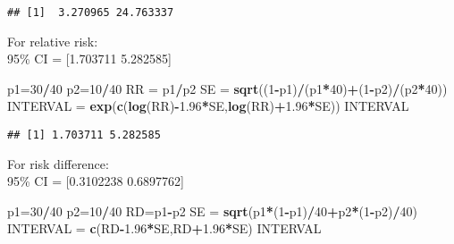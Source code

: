 \documentclass[]{article}
\newenvironment{Shaded}{\begin{snugshade}}{\end{snugshade}}
\newcommand{\KeywordTok}[1]{\textcolor[rgb]{0.13,0.29,0.53}{\textbf{#1}}}
\newcommand{\DecValTok}[1]{\textcolor[rgb]{0.00,0.00,0.81}{#1}}
\newcommand{\FloatTok}[1]{\textcolor[rgb]{0.00,0.00,0.81}{#1}}
\newcommand{\StringTok}[1]{\textcolor[rgb]{0.31,0.60,0.02}{#1}}
\newcommand{\OperatorTok}[1]{\textcolor[rgb]{0.81,0.36,0.00}{\textbf{#1}}}
\newcommand{\NormalTok}[1]{#1}
\begin{document}
\begin{verbatim}
## [1]  3.270965 24.763337
\end{verbatim}

For relative risk:\\
95\% CI = {[}1.703711 5.282585{]}

\begin{Shaded}
\begin{Highlighting}[]
\NormalTok{p1=}\DecValTok{30}\OperatorTok{/}\DecValTok{40}
\NormalTok{p2=}\DecValTok{10}\OperatorTok{/}\DecValTok{40}
\NormalTok{RR =}\StringTok{ }\NormalTok{p1}\OperatorTok{/}\NormalTok{p2}
\NormalTok{SE =}\StringTok{ }\KeywordTok{sqrt}\NormalTok{((}\DecValTok{1}\OperatorTok{-}\NormalTok{p1)}\OperatorTok{/}\NormalTok{(p1}\OperatorTok{*}\DecValTok{40}\NormalTok{)}\OperatorTok{+}\NormalTok{(}\DecValTok{1}\OperatorTok{-}\NormalTok{p2)}\OperatorTok{/}\NormalTok{(p2}\OperatorTok{*}\DecValTok{40}\NormalTok{))}
\NormalTok{INTERVAL =}\StringTok{ }\KeywordTok{exp}\NormalTok{(}\KeywordTok{c}\NormalTok{(}\KeywordTok{log}\NormalTok{(RR)}\OperatorTok{-}\FloatTok{1.96}\OperatorTok{*}\NormalTok{SE,}\KeywordTok{log}\NormalTok{(RR)}\OperatorTok{+}\FloatTok{1.96}\OperatorTok{*}\NormalTok{SE))}
\NormalTok{INTERVAL}
\end{Highlighting}
\end{Shaded}

\begin{verbatim}
## [1] 1.703711 5.282585
\end{verbatim}

For risk difference:\\
95\% CI = {[}0.3102238 0.6897762{]}

\begin{Shaded}
\begin{Highlighting}[]
\NormalTok{p1=}\DecValTok{30}\OperatorTok{/}\DecValTok{40}
\NormalTok{p2=}\DecValTok{10}\OperatorTok{/}\DecValTok{40}
\NormalTok{RD=p1}\OperatorTok{-}\NormalTok{p2}
\NormalTok{SE =}\StringTok{ }\KeywordTok{sqrt}\NormalTok{(p1}\OperatorTok{*}\NormalTok{(}\DecValTok{1}\OperatorTok{-}\NormalTok{p1)}\OperatorTok{/}\DecValTok{40}\OperatorTok{+}\NormalTok{p2}\OperatorTok{*}\NormalTok{(}\DecValTok{1}\OperatorTok{-}\NormalTok{p2)}\OperatorTok{/}\DecValTok{40}\NormalTok{)}
\NormalTok{INTERVAL =}\StringTok{ }\KeywordTok{c}\NormalTok{(RD}\OperatorTok{-}\FloatTok{1.96}\OperatorTok{*}\NormalTok{SE,RD}\OperatorTok{+}\FloatTok{1.96}\OperatorTok{*}\NormalTok{SE)}
\NormalTok{INTERVAL}
\end{Highlighting}
\end{Shaded}
\end{document}
